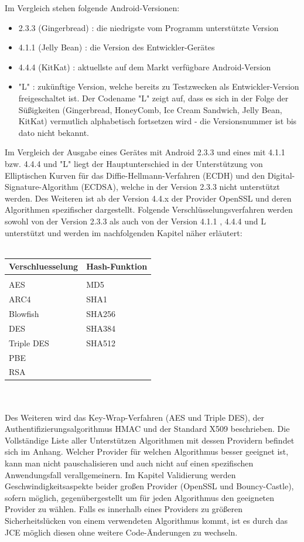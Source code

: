 \documentclass[10pt, a4paper]{scrreprt}
\begin{document}
Im Vergleich stehen folgende Android-Versionen:
\begin{itemize}
\item 2.3.3 (Gingerbread) : die niedrigste vom Programm unterstützte Version
\item 4.1.1 (Jelly Bean) : die Version des Entwickler-Gerätes
\item 4.4.4 (KitKat) : aktuellste auf dem Markt verfügbare Android-Version
\item "L" : zukünftige Version, welche bereits zu Testzwecken als Entwickler-Version freigeschaltet ist. Der Codename "L" zeigt auf, dass es sich in der Folge der Süßigkeiten (Gingerbread, HoneyComb, Ice Cream Sandwich, Jelly Bean, KitKat) vermutlich alphabetisch fortsetzen wird - die Versionsnummer ist bis dato nicht bekannt.
\end{itemize}
Im Vergleich der Ausgabe eines Gerätes mit Android 2.3.3 und eines mit 4.1.1 bzw. 4.4.4 und "L" liegt der Hauptunterschied in der Unterstützung von Elliptischen Kurven für das Diffie-Hellmann-Verfahren (ECDH) und den Digital-Signature-Algorithm (ECDSA), welche in der Version 2.3.3 nicht unterstützt werden. Des Weiteren ist ab der Version 4.4.x der Provider OpenSSL und deren Algorithmen spezifischer dargestellt.
Folgende Verschlüsselungsverfahren werden sowohl von der Version 2.3.3 als auch von der Version 4.1.1 , 4.4.4 und L unterstützt und werden im nachfolgenden Kapitel näher erläutert: \\ \\
\begin{tabular}{|l|l|} \hline\hline
\textbf{Verschluesselung} & \textbf{Hash-Funktion} \\ \hline &  \\
AES & MD5 \\
ARC4 & SHA1 \\
Blowfish & SHA256 \\
DES & SHA384 \\
Triple DES & SHA512 \\
PBE & \\
RSA & \\
\hline\hline
\end{tabular} \\
\\Des Weiteren wird das Key-Wrap-Verfahren (AES und Triple DES), der Authentifizierungsalgorithmus HMAC und der Standard X509 beschrieben. Die Vollständige Liste aller Unterstützen Algorithmen mit dessen Providern befindet sich im Anhang. Welcher Provider für welchen Algorithmus besser geeignet ist, kann man nicht pauschalisieren und auch nicht auf einen spezifischen Anwendungsfall verallgemeinern. Im Kapitel Validierung werden Geschwindigkeitsaspekte beider großen Provider (OpenSSL und Bouncy-Castle), sofern möglich, gegenübergestellt um für jeden Algorithmus den geeigneten Provider zu wählen. Falls es innerhalb eines Providers zu größeren Sicherheitslücken von einem verwendeten Algorithmus kommt, ist es durch das JCE möglich diesen ohne weitere Code-Änderungen zu wechseln.
\end{document}
